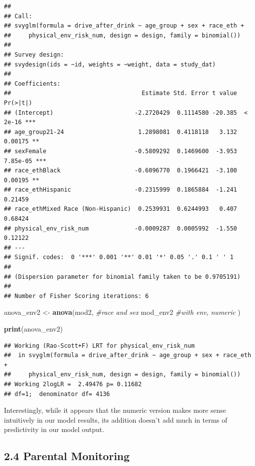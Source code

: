 \documentclass[
]{article}
\newenvironment{Shaded}{\begin{snugshade}}{\end{snugshade}}
\newcommand{\CommentTok}[1]{\textcolor[rgb]{0.56,0.35,0.01}{\textit{#1}}}
\newcommand{\FunctionTok}[1]{\textcolor[rgb]{0.13,0.29,0.53}{\textbf{#1}}}
\newcommand{\NormalTok}[1]{#1}
\newcommand{\OtherTok}[1]{\textcolor[rgb]{0.56,0.35,0.01}{#1}}
\begin{document}
\begin{verbatim}
## 
## Call:
## svyglm(formula = drive_after_drink ~ age_group + sex + race_eth + 
##     physical_env_risk_num, design = design, family = binomial())
## 
## Survey design:
## svydesign(ids = ~id, weights = ~weight, data = study_dat)
## 
## Coefficients:
##                                     Estimate Std. Error t value Pr(>|t|)    
## (Intercept)                       -2.2720429  0.1114580 -20.385  < 2e-16 ***
## age_group21-24                     1.2898081  0.4118118   3.132  0.00175 ** 
## sexFemale                         -0.5809292  0.1469600  -3.953 7.85e-05 ***
## race_ethBlack                     -0.6096770  0.1966421  -3.100  0.00195 ** 
## race_ethHispanic                  -0.2315999  0.1865884  -1.241  0.21459    
## race_ethMixed Race (Non-Hispanic)  0.2539931  0.6244993   0.407  0.68424    
## physical_env_risk_num             -0.0009287  0.0005992  -1.550  0.12122    
## ---
## Signif. codes:  0 '***' 0.001 '**' 0.01 '*' 0.05 '.' 0.1 ' ' 1
## 
## (Dispersion parameter for binomial family taken to be 0.9705191)
## 
## Number of Fisher Scoring iterations: 6
\end{verbatim}

\begin{Shaded}
\begin{Highlighting}[]
\NormalTok{anova\_env2 }\OtherTok{\textless{}{-}} \FunctionTok{anova}\NormalTok{(mod2, }\CommentTok{\#race and sex }
\NormalTok{                      mod\_env2 }\CommentTok{\#with env, numeric}
\NormalTok{                      ) }

\FunctionTok{print}\NormalTok{(anova\_env2)}
\end{Highlighting}
\end{Shaded}

\begin{verbatim}
## Working (Rao-Scott+F) LRT for physical_env_risk_num
##  in svyglm(formula = drive_after_drink ~ age_group + sex + race_eth + 
##     physical_env_risk_num, design = design, family = binomial())
## Working 2logLR =  2.49476 p= 0.11682 
## df=1;  denominator df= 4136
\end{verbatim}

Interestingly, while it appears that the numeric version makes more
sense intuitively in our model results, its addition doesn't add much in
terms of predictivity in our model output.

\subsection{2.4 Parental Monitoring}\label{parental-monitoring}
\end{document}
